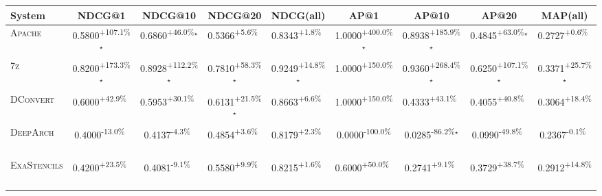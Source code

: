 \begin{table}[htbp]
\centering
\renewcommand{\arraystretch}{1.2}
\begin{tabular}{l|cccc|cccc}
\hline
System & NDCG@1 & NDCG@10 & NDCG@20 & NDCG(all) & AP@1 & AP@10 & AP@20 & MAP(all) \\ \hline
\textsc{Apache} & \cellcolor{green!30}0.5800\textsuperscript{+107.1\%}$^\star$ & \cellcolor{green!30}0.6860\textsuperscript{+46.0\%}$^\star$ & \cellcolor{green!30}0.5366\textsuperscript{+5.6\%}$^{\,\,\,}$ & \cellcolor{green!30}0.8343\textsuperscript{+1.8\%}$^{\,\,\,}$ & \cellcolor{green!30}1.0000\textsuperscript{+400.0\%}$^\star$ & \cellcolor{green!30}0.8938\textsuperscript{+185.9\%}$^\star$ & \cellcolor{green!30}0.4845\textsuperscript{+63.0\%}$^\star$ & \cellcolor{green!30}0.2727\textsuperscript{+0.6\%}$^{\,\,\,}$ \\
\textsc{7z} & \cellcolor{green!30}0.8200\textsuperscript{+173.3\%}$^\star$ & \cellcolor{green!30}0.8928\textsuperscript{+112.2\%}$^\star$ & \cellcolor{green!30}0.7810\textsuperscript{+58.3\%}$^\star$ & \cellcolor{green!30}0.9249\textsuperscript{+14.8\%}$^\star$ & \cellcolor{green!30}1.0000\textsuperscript{+150.0\%}$^{\,\,\,}$ & \cellcolor{green!30}0.9360\textsuperscript{+268.4\%}$^\star$ & \cellcolor{green!30}0.6250\textsuperscript{+107.1\%}$^\star$ & \cellcolor{green!30}0.3371\textsuperscript{+25.7\%}$^\star$ \\
\textsc{DConvert} & \cellcolor{green!30}0.6000\textsuperscript{+42.9\%}$^{\,\,\,}$ & \cellcolor{green!30}0.5953\textsuperscript{+30.1\%}$^{\,\,\,}$ & \cellcolor{green!30}0.6131\textsuperscript{+21.5\%}$^\star$ & \cellcolor{green!30}0.8663\textsuperscript{+6.6\%}$^{\,\,\,}$ & \cellcolor{green!30}1.0000\textsuperscript{+150.0\%}$^{\,\,\,}$ & \cellcolor{green!30}0.4333\textsuperscript{+43.1\%}$^{\,\,\,}$ & \cellcolor{green!30}0.4055\textsuperscript{+40.8\%}$^{\,\,\,}$ & \cellcolor{green!30}0.3064\textsuperscript{+18.4\%}$^{\,\,\,}$ \\
\textsc{DeepArch} & \cellcolor{red!30}0.4000\textsuperscript{-13.0\%}$^{\,\,\,}$ & \cellcolor{red!30}0.4137\textsuperscript{-4.3\%}$^{\,\,\,}$ & \cellcolor{green!30}0.4854\textsuperscript{+3.6\%}$^{\,\,\,}$ & \cellcolor{green!30}0.8179\textsuperscript{+2.3\%}$^{\,\,\,}$ & \cellcolor{red!30}0.0000\textsuperscript{-100.0\%}$^{\,\,\,}$ & \cellcolor{red!30}0.0285\textsuperscript{-86.2\%}$^\star$ & \cellcolor{red!30}0.0990\textsuperscript{-49.8\%}$^{\,\,\,}$ & \cellcolor{red!30}0.2367\textsuperscript{-0.1\%}$^{\,\,\,}$ \\
\textsc{ExaStencils} & \cellcolor{green!30}0.4200\textsuperscript{+23.5\%}$^{\,\,\,}$ & \cellcolor{red!30}0.4081\textsuperscript{-9.1\%}$^{\,\,\,}$ & \cellcolor{green!30}0.5580\textsuperscript{+9.9\%}$^{\,\,\,}$ & \cellcolor{green!30}0.8215\textsuperscript{+1.6\%}$^{\,\,\,}$ & \cellcolor{green!30}0.6000\textsuperscript{+50.0\%}$^{\,\,\,}$ & \cellcolor{green!30}0.2741\textsuperscript{+9.1\%}$^{\,\,\,}$ & \cellcolor{green!30}0.3729\textsuperscript{+38.7\%}$^{\,\,\,}$ & \cellcolor{green!30}0.2912\textsuperscript{+14.8\%}$^{\,\,\,}$ \\

\end{tabular}
\end{table}
